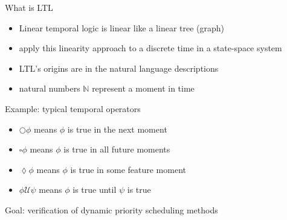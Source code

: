 \documentclass{beamer}
\begin{document}
		\begin{frame}{What is LTL}
		\begin{itemize}

			\item Linear temporal logic is linear like a linear tree (graph)
			 \item apply this linearity approach to a discrete time in a state-space system 
			\item LTL's origins are in the natural language descriptions
			\item natural numbers $\mathbb{N}$ represent a moment in time
					
		\end{itemize}
		Example: typical temporal operators
		\begin{itemize}
			\item $\bigcirc \phi$ means $\phi$ is true in the next moment 
			\item $\square \phi$  means $\phi$ is true in all future moments
			\item $\lozenge \phi$ means $\phi$ is true in some feature moment
			\item $\phi \mathcal{U} \psi$ means $\phi$ is true until $\psi$ is true
		\end{itemize}
			
			Goal: verification of dynamic priority scheduling methods  
	
	 	
	\end{frame}
	

		
	

	

%
\end{document}
